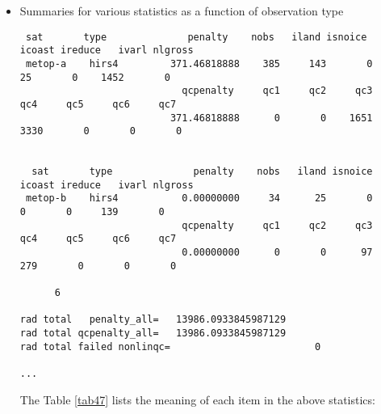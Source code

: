 \begin{itemize}[leftmargin=*]

\item Summaries for various statistics as a function of observation type
  
\begin{scriptsize}
\begin{verbatim} 
 sat       type              penalty    nobs   iland isnoice  icoast ireduce   ivarl nlgross
 metop-a    hirs4         371.46818888    385     143       0      25       0    1452       0
                            qcpenalty     qc1     qc2     qc3     qc4     qc5     qc6     qc7
                          371.46818888      0       0    1651    3330       0       0       0


  sat       type              penalty    nobs   iland isnoice  icoast ireduce   ivarl nlgross
 metop-b    hirs4           0.00000000     34      25       0       0       0     139       0
                            qcpenalty     qc1     qc2     qc3     qc4     qc5     qc6     qc7
                            0.00000000      0       0      97     279       0       0       0

      6

rad total   penalty_all=   13986.0933845987129
rad total qcpenalty_all=   13986.0933845987129
rad total failed nonlinqc=                         0

...
\end{verbatim}
\end{scriptsize}

The Table \ref{tab47} lists the meaning of each item in the above statistics:


\end{itemize}
